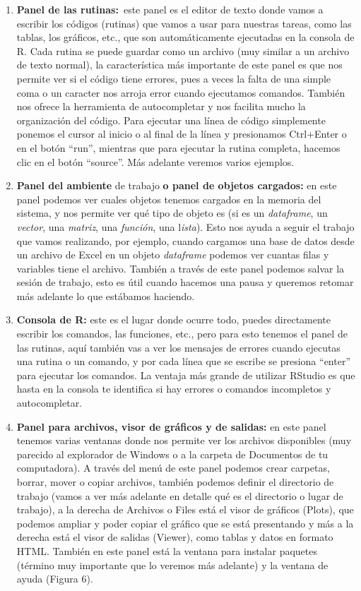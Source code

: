 \documentclass[
  letterpaper,
  DIV=11,
  numbers=noendperiod]{scrreprt}
\begin{document}
\begin{enumerate}
\def\labelenumi{\arabic{enumi}.}
\item
  \textbf{Panel de las rutinas:}~este panel es el editor de texto donde
  vamos a escribir los códigos (rutinas) que vamos a usar para nuestras
  tareas, como las tablas, los gráficos, etc., que son automáticamente
  ejecutadas en la consola de R. Cada rutina se puede guardar como un
  archivo (muy similar a un archivo de texto normal), la característica
  más importante de este panel es que nos permite ver si el código tiene
  errores, pues a veces la falta de una simple coma o un caracter nos
  arroja error cuando ejecutamos comandos. También nos ofrece la
  herramienta de autocompletar y nos facilita mucho la organización del
  código. Para ejecutar una línea de código simplemente ponemos el
  cursor al inicio o al final de la línea y presionamos Ctrl+Enter o en
  el botón ``run'', mientras que para ejecutar la rutina completa,
  hacemos clic en el botón ``source''. Más adelante veremos varios
  ejemplos.
\item
  \textbf{Panel del ambiente} de trabajo \textbf{o panel de objetos
  cargados:} en este panel podemos ver cuales objetos tenemos cargados
  en la memoria del sistema, y nos permite ver qué tipo de objeto es (si
  es un \emph{dataframe}, un \emph{vector}, una \emph{matriz}, una
  \emph{función}, una l\emph{ista}). Esto nos ayuda a seguir el trabajo
  que vamos realizando, por ejemplo, cuando cargamos una base de datos
  desde un archivo de Excel en un objeto \emph{dataframe} podemos ver
  cuantas filas y variables tiene el archivo. También a través de este
  panel podemos salvar la sesión de trabajo, esto es útil cuando hacemos
  una pausa y queremos retomar más adelante lo que estábamos haciendo.
\item
  \textbf{Consola de R:} este es el lugar donde ocurre todo, puedes
  directamente escribir los comandos, las funciones, etc., pero para
  esto tenemos el panel de las rutinas, aquí también vas a ver los
  mensajes de errores cuando ejecutas una rutina o un comando, y por
  cada línea que se escribe se presiona ``enter'' para ejecutar los
  comandos. La ventaja más grande de utilizar RStudio es que hasta en la
  consola te identifica si hay errores o comandos incompletos y
  autocompletar.
\item
  \textbf{Panel para archivos, visor de gráficos y de salidas:} en este
  panel tenemos varias ventanas donde nos permite ver los archivos
  disponibles (muy parecido al explorador de Windows o a la carpeta de
  Documentos de tu computadora). A través del menú de este panel podemos
  crear carpetas, borrar, mover o copiar archivos, también podemos
  definir el directorio de trabajo (vamos a ver más adelante en detalle
  qué es el directorio o lugar de trabajo), a la derecha de Archivos o
  Files está el visor de gráficos (Plots), que podemos ampliar y poder
  copiar el gráfico que se está presentando y más a la derecha está el
  visor de salidas (Viewer), como tablas y datos en formato HTML.
  También en este panel está la ventana para instalar paquetes (término
  muy importante que lo veremos más adelante) y la ventana de ayuda
  (Figura 6).


\end{enumerate}
\end{document}
